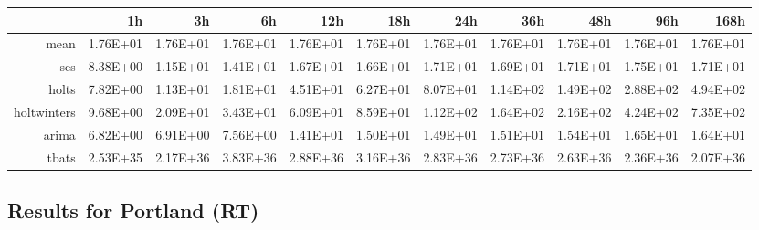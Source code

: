 \begin{landscape}
\begin{table}[ht]
\begin{tabular}{rrrrrrrrrrr}
   \hline
\end{tabular}
\end{table}
\begin{table}[ht]
\centering
\begin{tabular}{rrrrrrrrrrr}
  \hline
 & 1h & 3h & 6h & 12h & 18h & 24h & 36h & 48h & 96h & 168h \\ 
  \hline
mean & 1.76E+01 & 1.76E+01 & 1.76E+01 & 1.76E+01 & 1.76E+01 & 1.76E+01 & 1.76E+01 & 1.76E+01 & 1.76E+01 & 1.76E+01 \\ 
  ses & 8.38E+00 & 1.15E+01 & 1.41E+01 & 1.67E+01 & 1.66E+01 & 1.71E+01 & 1.69E+01 & 1.71E+01 & 1.75E+01 & 1.71E+01 \\ 
  holts & 7.82E+00 & 1.13E+01 & 1.81E+01 & 4.51E+01 & 6.27E+01 & 8.07E+01 & 1.14E+02 & 1.49E+02 & 2.88E+02 & 4.94E+02 \\ 
  holtwinters & 9.68E+00 & 2.09E+01 & 3.43E+01 & 6.09E+01 & 8.59E+01 & 1.12E+02 & 1.64E+02 & 2.16E+02 & 4.24E+02 & 7.35E+02 \\ 
  arima & 6.82E+00 & 6.91E+00 & 7.56E+00 & 1.41E+01 & 1.50E+01 & 1.49E+01 & 1.51E+01 & 1.54E+01 & 1.65E+01 & 1.64E+01 \\ 
  tbats & 2.53E+35 & 2.17E+36 & 3.83E+36 & 2.88E+36 & 3.16E+36 & 2.83E+36 & 2.73E+36 & 2.63E+36 & 2.36E+36 & 2.07E+36 \\ 
   \hline
\end{tabular}
\end{table}


\subsection{Results for Portland (RT)}


\end{landscape}
